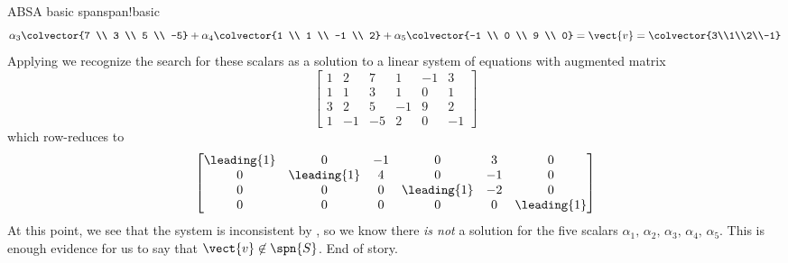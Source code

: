 \begin{example}{ABS}{A basic span}{span!basic}
\begin{equation*}
\alpha_3\colvector{7 \\ 3 \\ 5 \\ -5}+
\alpha_4\colvector{1 \\ 1 \\ -1 \\ 2}+
\alpha_5\colvector{-1 \\ 0 \\ 9 \\ 0}
=\vect{v}
=\colvector{3\\1\\2\\-1}
\end{equation*}
%
Applying  we recognize the search for these scalars as a solution to a linear system of equations with augmented matrix
%
\begin{equation*}
\begin{bmatrix}
 1 & 2 & 7 & 1 & -1 & 3 \\
 1 & 1 & 3 & 1 & 0 & 1 \\
 3 & 2 & 5 & -1 & 9 & 2 \\
 1 & -1 & -5 & 2 & 0 & -1
\end{bmatrix}
\end{equation*}
%
which row-reduces to
%
\begin{equation*}
\begin{bmatrix}
 \leading{1} & 0 & -1 & 0 & 3 & 0 \\
 0 & \leading{1} & 4 & 0 & -1 & 0 \\
 0 & 0 & 0 & \leading{1} & -2 & 0 \\
 0 & 0 & 0 & 0 & 0 & \leading{1}
\end{bmatrix}
\end{equation*}
%
At this point, we see that the system is inconsistent by , so we know there {\em is not} a solution for the five scalars $\alpha_1,\,\alpha_2,\,\alpha_3,\,\alpha_4,\,\alpha_5$.  This is enough evidence for us to say that $\vect{v}\not\in\spn{S}$.  End of story.  
%
\end{example}
%
